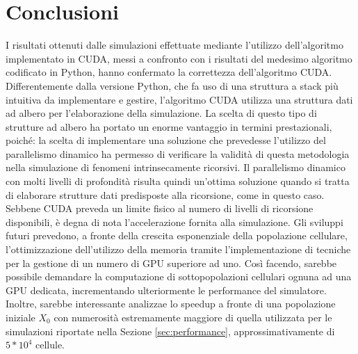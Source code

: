 
\chapter{Conclusioni} %

\label{Conclusioni} %



I risultati ottenuti dalle simulazioni effettuate mediante
l'utilizzo dell'algoritmo implementato in CUDA, messi a confronto con i
risultati del medesimo algoritmo codificato in Python, hanno confermato
la correttezza dell'algoritmo CUDA. Differentemente dalla versione Python, che fa uso di una
struttura a stack più intuitiva da implementare e gestire,
l'algoritmo CUDA utilizza una struttura dati ad albero
per l'elaborazione della simulazione. La scelta di questo tipo di strutture 
ad albero ha portato un enorme
vantaggio in termini prestazionali, poiché: la scelta di implementare
una soluzione che prevedesse l'utilizzo del parallelismo dinamico ha permesso di
verificare la validità di questa metodologia nella simulazione di fenomeni
intrinsecamente ricorsivi. Il parallelismo dinamico con molti livelli
di profondità risulta quindi un'ottima soluzione quando si tratta di elaborare
strutture dati predisposte alla ricorsione, come in questo caso. Sebbene CUDA
preveda un limite fisico al numero di livelli di ricorsione disponibili, è
degna di nota l'accelerazione fornita alla simulazione.
Gli sviluppi futuri prevedono, a fronte della crescita esponenziale della 
popolazione cellulare, l'ottimizzazione dell'utilizzo della memoria 
tramite l'implementazione di tecniche per la gestione di un numero 
di GPU superiore ad uno. Così facendo, sarebbe possibile demandare la computazione 
di sottopopolazioni cellulari ognuna ad una GPU dedicata, incrementando 
ulteriormente le performance del simulatore. Inoltre, sarebbe interessante 
analizzae lo speedup a fronte di una popolazione iniziale $X_{0}$ con 
numerosità estremamente maggiore di quella utilizzata per le simulazioni 
riportate nella Sezione \ref{sec:performance}, approssimativamente di $5*10^4$
cellule.

